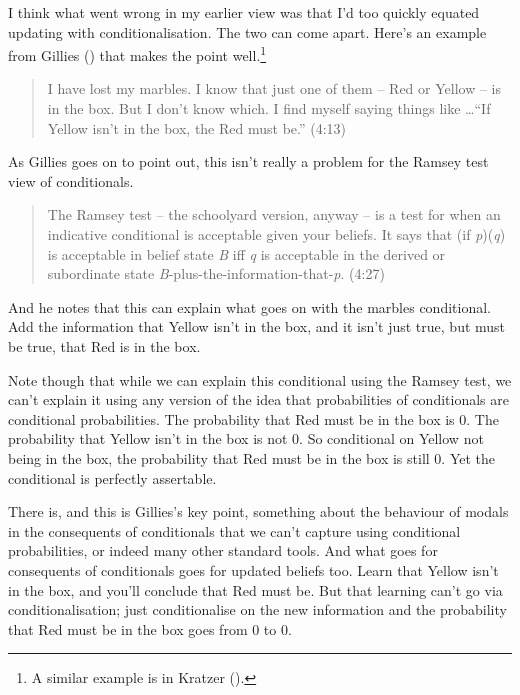 \documentclass[
  11pt,
  letterpaper,
  DIV=11,
  numbers=noendperiod,
  twoside]{scrartcl}
\begin{document}
I think what went wrong in my earlier view was that I'd too quickly
equated updating with conditionalisation. The two can come apart. Here's
an example from Gillies () that makes
the point well.\footnote{A similar example is in Kratzer
  ().}

\begin{quote}
I have lost my marbles. I know that just one of them -- Red or Yellow --
is in the box. But I don't know which. I find myself saying things like
\ldots{}``If Yellow isn't in the box, the Red must be.'' (4:13)
\end{quote}

As Gillies goes on to point out, this isn't really a problem for the
Ramsey test view of conditionals.

\begin{quote}
The Ramsey test -- the schoolyard version, anyway -- is a test for when
an indicative conditional is acceptable given your beliefs. It says that
(if \emph{p})(\emph{q}) is acceptable in belief state \emph{B} iff
\emph{q} is acceptable in the derived or subordinate state
\emph{B}-plus-the-information-that-\emph{p}. (4:27)
\end{quote}

And he notes that this can explain what goes on with the marbles
conditional. Add the information that Yellow isn't in the box, and it
isn't just true, but must be true, that Red is in the box.

Note though that while we can explain this conditional using the Ramsey
test, we can't explain it using any version of the idea that
probabilities of conditionals are conditional probabilities. The
probability that Red must be in the box is 0. The probability that
Yellow isn't in the box is not 0. So conditional on Yellow not being in
the box, the probability that Red must be in the box is still 0. Yet the
conditional is perfectly assertable.

There is, and this is Gillies's key point, something about the behaviour
of modals in the consequents of conditionals that we can't capture using
conditional probabilities, or indeed many other standard tools. And what
goes for consequents of conditionals goes for updated beliefs too. Learn
that Yellow isn't in the box, and you'll conclude that Red must be. But
that learning can't go via conditionalisation; just conditionalise on
the new information and the probability that Red must be in the box goes
from 0 to 0.
\end{document}
